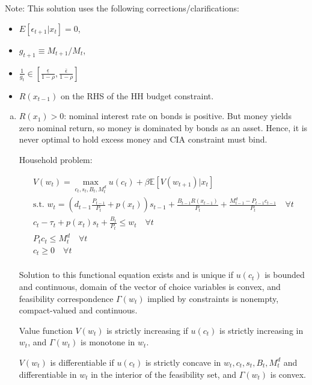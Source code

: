 \documentclass{article}
\newcommand{\E}{\mathbb{E}}
\begin{document}
\section{}

Note: This solution uses the following corrections/clarifications:
\begin{itemize}
\item $E[\epsilon_{t+1}|x_t]=0$,
\item  $g_{t+1}\equiv M_{t+1}/M_t$,
\item $\frac{1}{g_t}\in[\frac{\underline{\epsilon}}{1-\rho},\frac{\bar{\epsilon}}{1-\rho}]$
\item $R(x_{t-1})$ on the RHS of the HH budget constraint.
\end{itemize}

\begin{enumerate}[(a)]
\item $R(x_1)>0$: nominal interest rate on bonds is positive. But
  money yields zero nominal return, so money is dominated by bonds as
  an asset. Hence, it is never optimal to hold excess money and CIA
  constraint must bind.

  Household problem:

  \begin{gather*}
    V(w_t)=\max_{c_t,s_t,B_t,M_t^d} u(c_t)+\beta\E[V(w_{t+1})|x_t]\\
    \text{s.t. } w_t =
    (d_{t-1}\frac{P_{t-1}}{P_t}+p(x_t))s_{t-1}+\frac{B_{t-1}R(x_{t-1})}{P_t}+\frac{M_{t-1}^d-P_{t-1}c_{t-1}}{P_t}\quad\forall t\\
    c_t-\tau_t+p(x_t)s_t+\frac{B_t}{P_t}\le w_t\quad\forall t\\
    P_tc_t\le M_t^d\quad\forall t\\
    c_t\ge 0\quad\forall t\\
  \end{gather*}

  Solution to this functional equation exists and is unique if
  $u(c_t)$ is bounded and continuous, domain of the vector of choice
  variables is convex, and feasibility correspondence $\Gamma(w_t)$
  implied by constraints is nonempty, compact-valued and continuous.

  Value function $V(w_t)$ is strictly increasing if $u(c_t)$ is
  strictly increasing in $w_t$, and $\Gamma(w_t)$ is monotone in
  $w_t$.

  $V(w_t)$ is differentiable if $u(c_t)$ is strictly concave in
  $w_t,c_t,s_t,B_t,M_t^d$ and differentiable in $w_t$ in the interior
  of the feasibility set, and $\Gamma(w_t)$ is convex.


\end{enumerate}
\end{document}
